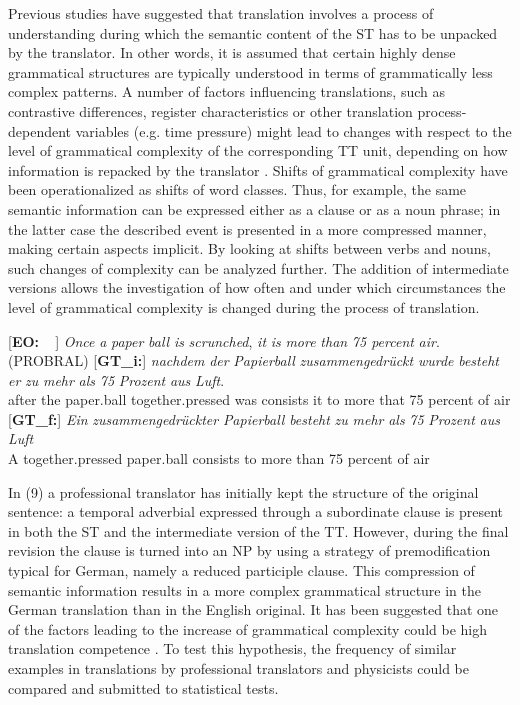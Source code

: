 \documentclass[output=paper]{LSP/langsci}
\begin{document}
Previous studies have suggested that translation involves a process of understanding during which the semantic content of the ST has to be unpacked by the translator. In other words, it is assumed that certain highly dense grammatical structures are typically understood in terms of grammatically less complex patterns. A number of factors influencing translations, such as contrastive differences, register characteristics or other translation process-dependent variables (e.g. time pressure) might lead to changes with respect to the level of grammatical complexity of the corresponding TT unit, depending on how information is repacked by the translator \citep{Steiner2001,Hansen-Schirra2012}. Shifts of grammatical complexity have been operationalized as shifts of word classes. Thus, for example, the same semantic information can be expressed either as a clause or as a noun phrase; in the latter case the described event is presented in a more compressed manner, making certain aspects implicit. By looking at shifts between verbs and nouns, such changes of complexity can be analyzed further. The addition of intermediate versions allows the investigation of how often and under which circumstances the level of grammatical complexity is changed during the process of translation. 

\ea
\begin{xlist}
\exi{}[\textbf{EO:~~}]{ \emph{Once} \emph{a} \emph{paper} \emph{ball} \emph{is} \emph{scrunched}, \emph{it} \emph{is} \emph{more} \emph{than} \emph{75 percent} \emph{air}. (PROBRAL)}
\exi{}[\textbf{GT\_i:}]{
\gll \emph{nachdem} \emph{der} \emph{Papierball} \emph{zusammengedrückt} \emph{wurde} \emph{besteht} \emph{er} \emph{zu} \emph{mehr} \emph{als} \emph{75} \emph{Prozent} \emph{aus} \emph{Luft}.\\
after the paper.ball together.pressed was consists it to more that 75 percent of air\\}
\exi{}[\textbf{GT\_f:}]{
\gll \emph{Ein} \emph{zusammengedrückter} \emph{Papierball} \emph{besteht} \emph{zu} \emph{mehr} \emph{als} \emph{75} \emph{Prozent} \emph{aus} \emph{Luft}\\
A together.pressed paper.ball consists to more than 75 percent of air\\
}
\end{xlist}
\z

In (9) a professional translator has initially kept the structure of the original sentence: a temporal adverbial expressed through a subordinate clause is present in both the ST and the intermediate version of the TT. However, during the final revision the clause is turned into an NP by using a strategy of premodification typical for German, namely a reduced participle clause. This compression of semantic information results in a more complex grammatical structure in the German translation than in the English original. It has been suggested that one of the factors leading to the increase of grammatical complexity could be high translation competence \citep[260]{Hansen-Schirra2012}. To test this hypothesis, the frequency of similar examples in translations by professional translators and physicists could be compared and submitted to statistical tests. 
\end{document}

